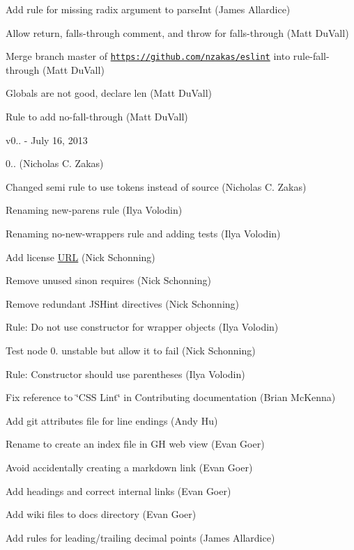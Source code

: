 \begin{DoxyItemize}
\item Add rule for missing radix argument to parse\+Int (James Allardice)
\item Allow return, falls-\/through comment, and throw for falls-\/through (Matt Du\+Vall)
\item Merge branch \textquotesingle{}master\textquotesingle{} of \href{https://github.com/nzakas/eslint}{\tt https\+://github.\+com/nzakas/eslint} into rule-\/fall-\/through (Matt Du\+Vall)
\item Globals are not good, declare len (Matt Du\+Vall)
\item Rule to add no-\/fall-\/through (Matt Du\+Vall)
\end{DoxyItemize}

v0.. -\/ July 16, 2013


\begin{DoxyItemize}
\item 0.. (Nicholas C. Zakas)
\item Changed semi rule to use tokens instead of source (Nicholas C. Zakas)
\item Renaming new-\/parens rule (Ilya Volodin)
\item Renaming no-\/new-\/wrappers rule and adding tests (Ilya Volodin)
\item Add license \mbox{\hyperlink{namespace_u_r_l}{U\+RL}} (Nick Schonning)
\item Remove unused sinon requires (Nick Schonning)
\item Remove redundant J\+S\+Hint directives (Nick Schonning)
\item Rule\+: Do not use constructor for wrapper objects (Ilya Volodin)
\item Test node 0. unstable but allow it to fail (Nick Schonning)
\item Rule\+: Constructor should use parentheses (Ilya Volodin)
\item Fix reference to \char`\"{}\+C\+S\+S Lint\char`\"{} in Contributing documentation (Brian Mc\+Kenna)
\item Add git attributes file for line endings (Andy Hu)
\item Rename to create an \textquotesingle{}index\textquotesingle{} file in GH web view (Evan Goer)
\item Avoid accidentally creating a markdown link (Evan Goer)
\item Add headings and correct internal links (Evan Goer)
\item Add wiki files to docs directory (Evan Goer)
\item Add rules for leading/trailing decimal points (James Allardice)

\end{DoxyItemize}
